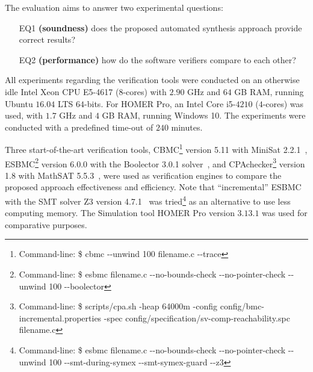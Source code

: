 The evaluation aims to answer two experimental questions: 

\begin{enumerate}

\item[EQ1] \textbf{(soundness)} does the proposed automated synthesis approach provide correct results?

\item[EQ2] \textbf{(performance)} how do the software verifiers compare to each other?

\end{enumerate}

All experiments regarding the verification tools were conducted 
on an otherwise idle Intel Xeon CPU E5-4617 ($8$-cores) with 
$2.90$ GHz and $64$ GB RAM, running Ubuntu $16.04$ LTS $64$-bits. 
For HOMER Pro, an Intel Core i5-$4210$ ($4$-cores) was used, 
with $1.7$ GHz and $4$ GB RAM, running Windows 10. 
The experiments were conducted with a predefined time-out of $240$ minutes.

Three start-of-the-art verification tools, CBMC\footnote{Command-line: \$ cbmc -\phantom{}-unwind 100 filename.c -\phantom{}-trace} version 5.11 with MiniSat 2.2.1~\cite{Kroening}, ESBMC\footnote{Command-line: \$ esbmc filename.c -\phantom{}-no-bounds-check -\phantom{}-no-pointer-check -\phantom{}-unwind 100 -\phantom{}-boolector} version 6.0.0 with the  Boolector 3.0.1 solver~\cite{Brummayer}, %
and CPAchecker\footnote{Command-line: \$ scripts/cpa.sh -heap 64000m -config config/bmc-incremental.properties -spec config/specification/sv-comp-reachability.spc filename.c} version 1.8 with MathSAT 5.5.3~\cite{mathsat5}, were used as verification engines to compare the proposed approach effectiveness and efficiency. Note that ``incremental'' ESBMC with the SMT solver Z3 version 4.7.1~\cite{DeMoura} was tried\footnote{Command-line: \$ esbmc filename.c -\phantom{}-no-bounds-check -\phantom{}-no-pointer-check -\phantom{}-unwind 100 -\phantom{}-smt-during-symex -\phantom{}-smt-symex-guard -\phantom{}-z3} as an alternative to use less computing memory. The Simulation tool HOMER Pro version $3.13.1$ was used for comparative purposes.

